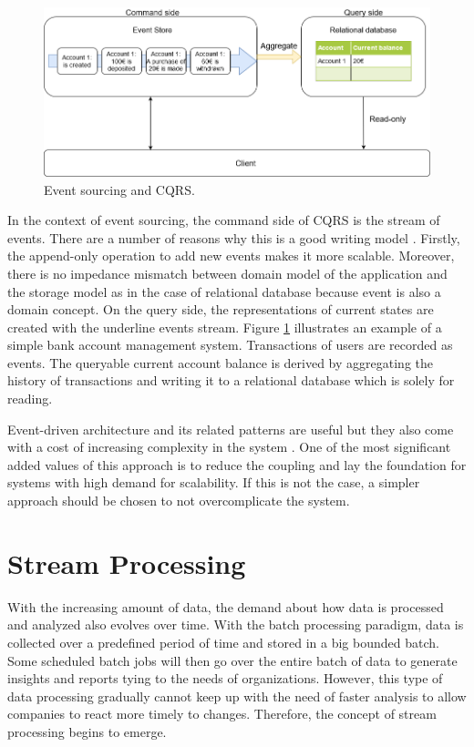 \begin{figure}[h]
	\centering
	\includegraphics[width=14cm]{images/cqrs.png}
	\caption{Event sourcing and CQRS.}
	\label{fig:cqrs}
\end{figure}

In the context of event sourcing, the command side of CQRS is the stream of events. There are a number of reasons why this is a good writing model \cite{cqrsgregyoung}. Firstly, the append-only operation to add new events makes it more scalable. Moreover, there is no impedance mismatch between domain model of the application and the storage model as in the case of relational database because event is also a domain concept. On the query side, the representations of current states are created with the underline events stream. Figure \ref{fig:cqrs} illustrates an example of a simple bank account management system. Transactions of users are recorded as events. The queryable current account balance is derived by aggregating the history of transactions and writing it to a relational database which is solely for reading.

Event-driven architecture and its related patterns are useful but they also come with a cost of increasing complexity in the system \cite{eventsourcingishard}. One of the most significant added values of this approach is to reduce the coupling and lay the foundation for systems with high demand for scalability. If this is not the case, a simpler approach should be chosen to not overcomplicate the system.




\section{Stream Processing} \label{section:eventstreamprocessing}
With the increasing amount of data, the demand about how data is processed and analyzed also evolves over time. With the batch processing paradigm, data is collected over a predefined period of time and stored in a big bounded batch. Some scheduled batch jobs will then go over the entire batch of data to generate insights and reports tying to the needs of organizations. However, this type of data processing gradually cannot keep up with the need of faster analysis to allow companies to react more timely to changes. Therefore, the concept of stream processing begins to emerge.


